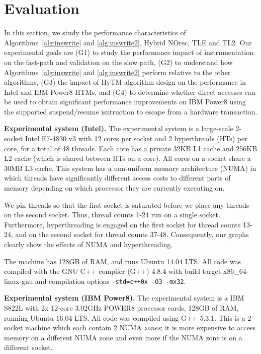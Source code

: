 \section{Evaluation}
\label{sec:eval}
%
In this section, we study the performance characteristics of Algorithms~\ref{alg:inswrite} and \ref{alg:inswrite2}, Hybrid NOrec, TLE and TL2.
Our experimental goals are (G1) to study the performance impact of instrumentation on the fast-path and validation on the slow path, 
(G2) to understand how Algorithms~\ref{alg:inswrite} and \ref{alg:inswrite2} perform relative to the other algorithms,
(G3) the impact of HyTM algorithm design on the performance in Intel and IBM Power8 HTMs, and 
(G4) to determine whether direct accesses can be used to obtain significant performance improvements on IBM Power8 using the supported suspend/resume isntruction to escape from a hardware transaction.

\vspace{1mm}\noindent\textbf{Experimental system (Intel).}
The experimental system is a large-scale 2-socket Intel E7-4830 v3 with 12 cores per socket and 2 hyperthreads (HTs) per core, for a total of 48 threads.
Each core has a private 32KB L1 cache and 256KB L2 cache (which is shared between HTs on a core).
All cores on a socket share a 30MB L3 cache.
This system has a non-uniform memory architecture (NUMA) in which threads have significantly different access costs to different parts of memory depending on which processor they are currently executing on.

We pin threads so that the first socket is saturated before we place any threads on the second socket.
Thus, thread counts 1-24 run on a single socket.
Furthermore, hyperthreading is engaged on the first socket for thread counts 13-24, and on the second socket for thread counts 37-48.
Consequently, our graphs clearly show the effects of NUMA and hyperthreading.

The machine has 128GB of RAM, and runs Ubuntu 14.04 LTS.
All code was compiled with the GNU C++ compiler (G++) 4.8.4 with build target x86\_64-linux-gnu and compilation options \texttt{-std=c++0x -O3 -mx32}.

\vspace{1mm}\noindent\textbf{Experimental system (IBM Power8).}
The experimental system is a IBM S822L with 2x 12-core 3.02GHz POWER8 processor cards, 128GB of RAM, running Ubuntu 16.04 LTS.
All code was compiled using G++ 5.3.1. This is a 2-socket machine which each contain 2 NUMA \emph{zones}; it is more expensive to access memory on a different NUMA zone and even more if the NUMA zone is on a different 
socket.

